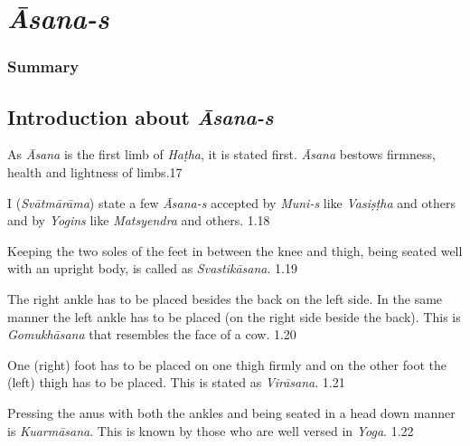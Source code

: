 \chapter{\textit{Āsana-s}}

\subsection*{Summary}

\section*{Introduction about \textit{Āsana-s}}

As \textit{Āsana} is the first limb of \textit{Haṭha}, it is stated first. \textit{Āsana} bestows firmness, health and lightness of limbs.17 

I (\textit{Svātmārāma}) state a few \textit{Āsana-s} accepted by \textit{Muni-s} like \textit{Vasiṣṭha} and others and by \textit{Yogins} like \textit{Matsyendra} and others.  1.18


\vspace{-5pt}

Keeping the two soles of the feet in between the knee and thigh, being seated well with an upright body, is called as \textit{Svastikāsana}.  1.19


\vspace{-5pt}

The right ankle has to be placed besides the back on the left side. In the same manner the left ankle has to be placed (on the right side beside the back). This is \textit{Gomukhāsana} that resembles the face of a cow. 1.20


\vspace{-5pt}

One (right) foot has to be placed on one thigh firmly and on the other foot the (left) thigh has to be placed. This is stated as \textit{Virāsana}. 1.21


\vspace{-5pt}

Pressing the anus with both the ankles and being seated in a head down manner is \textit{Kuarmāsana}. This is known by those who are well versed in \textit{Yoga}. 1.22

